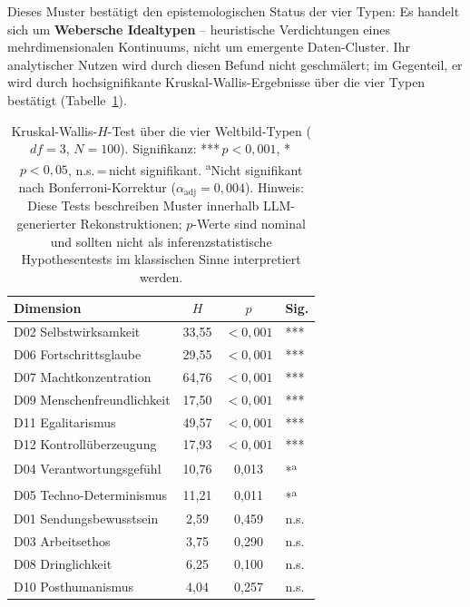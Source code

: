 \documentclass[12pt,a4paper]{article}
\begin{document}
Dieses Muster best\"atigt den epistemologischen Status der vier Typen: Es handelt sich um \textbf{Webersche Idealtypen} -- heuristische Verdichtungen eines mehrdimensionalen Kontinuums, nicht um emergente Daten-Cluster. Ihr analytischer Nutzen wird durch diesen Befund nicht geschm\"alert; im Gegenteil, er wird durch hochsignifikante Kruskal-Wallis-Ergebnisse \"uber die vier Typen best\"atigt (Tabelle~\ref{tab:kruskal}).

\begin{table}[htbp]
  \centering
  \caption{Kruskal-Wallis-$H$-Test \"uber die vier Weltbild-Typen ($df = 3$, $N = 100$). Signifikanz: {*}{*}{*}\,$p < 0{,}001$, {*}\,$p < 0{,}05$, n.s.\,=\,nicht signifikant. \textsuperscript{a}Nicht signifikant nach Bonferroni-Korrektur ($\alpha_{\mathrm{adj}} = 0{,}004$). Hinweis: Diese Tests beschreiben Muster innerhalb LLM-generierter Rekonstruktionen; $p$-Werte sind nominal und sollten nicht als inferenzstatistische Hypothesentests im klassischen Sinne interpretiert werden.}
  \label{tab:kruskal}
  \footnotesize
  \begin{tabular}{l c c l}
    \toprule
    \textbf{Dimension} & $H$ & $p$ & \textbf{Sig.} \\
    \midrule
    D02 Selbstwirksamkeit & 33,55 & $< 0{,}001$ & {*}{*}{*} \\
    D06 Fortschrittsglaube & 29,55 & $< 0{,}001$ & {*}{*}{*} \\
    D07 Machtkonzentration & 64,76 & $< 0{,}001$ & {*}{*}{*} \\
    D09 Menschenfreundlichkeit & 17,50 & $< 0{,}001$ & {*}{*}{*} \\
    D11 Egalitarismus & 49,57 & $< 0{,}001$ & {*}{*}{*} \\
    D12 Kontroll\"uberzeugung & 17,93 & $< 0{,}001$ & {*}{*}{*} \\
    \midrule
    D04 Verantwortungsgef\"uhl & 10,76 & 0,013 & {*}\textsuperscript{a} \\
    D05 Techno-Determinismus & 11,21 & 0,011 & {*}\textsuperscript{a} \\
    \midrule
    D01 Sendungsbewusstsein & 2,59 & 0,459 & n.s. \\
    D03 Arbeitsethos & 3,75 & 0,290 & n.s. \\
    D08 Dringlichkeit & 6,25 & 0,100 & n.s. \\
    D10 Posthumanismus & 4,04 & 0,257 & n.s. \\
    \bottomrule
  \end{tabular}
\end{table}
\end{document}
